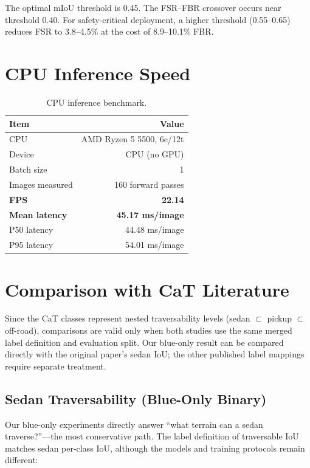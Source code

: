 \documentclass[12pt,a4paper]{report}
\begin{document}
The optimal mIoU threshold is 0.45.
The FSR--FBR crossover occurs near threshold 0.40.
For safety-critical deployment, a higher threshold (0.55--0.65) reduces FSR to 3.8--4.5\% at the cost of 8.9--10.1\% FBR.

\section{CPU Inference Speed}

\begin{table}[H]
\centering
\caption{CPU inference benchmark.}
\label{tab:inference}
\begin{tabular}{@{}lr@{}}
\toprule
\textbf{Item} & \textbf{Value} \\
\midrule
CPU                & AMD Ryzen 5 5500, 6c/12t \\
Device             & CPU (no GPU) \\
Batch size         & 1 \\
Images measured    & 160 forward passes \\
\textbf{FPS}       & \textbf{22.14} \\
\textbf{Mean latency} & \textbf{45.17 ms/image} \\
P50 latency        & 44.48 ms/image \\
P95 latency        & 54.01 ms/image \\
\bottomrule
\end{tabular}
\end{table}

\section{Comparison with CaT Literature}
\label{sec:comparison}

Since the CaT classes represent nested traversability levels (sedan $\subset$
pickup $\subset$ off-road), comparisons are valid only when both studies use
the same merged label definition and evaluation split. Our blue-only result can
be compared directly with the original paper's sedan IoU; the other published
label mappings require separate treatment.

\subsection{Sedan Traversability (Blue-Only Binary)}

Our blue-only experiments directly answer ``what terrain can a sedan traverse?''---the most conservative path.
The label definition of traversable IoU matches sedan per-class IoU, although
the models and training protocols remain different:
\end{document}
